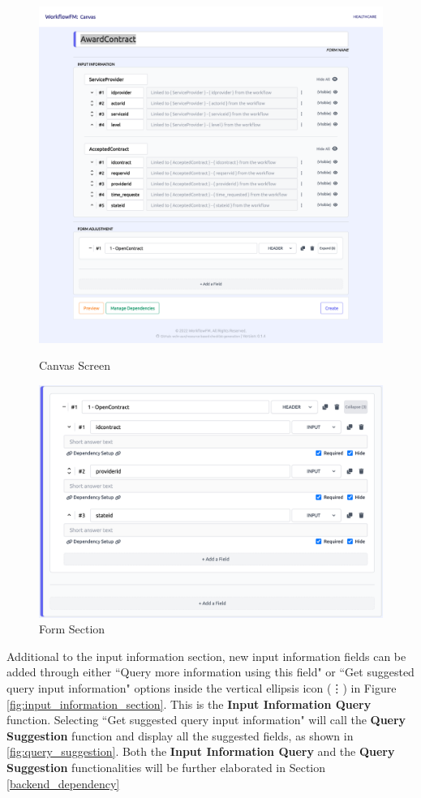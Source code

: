 \begin{figure}[ht!]
\centering
\begin{minipage}{.5\textwidth}
  \centering
  \includegraphics[width=0.9\linewidth]{overleaf/images/screens/canvas_screen.png}
  \caption{Canvas Screen}
  \label{fig:canvas_screen}
\end{minipage}%
\begin{minipage}{.5\textwidth}
  \centering
  \includegraphics[width=0.9\linewidth]{overleaf/images/screens/form_section.png}
  \caption{Form Section}
  \label{fig:form_section}
\end{minipage}
\end{figure}


Additional to the input information section, new input information fields can be added through either ``Query more information using this field" or ``Get suggested query input information" options inside the vertical ellipsis icon (\vdots) in Figure \ref{fig:input_information_section}. This is the \textbf{Input Information Query} function. Selecting ``Get suggested query input information" will call the \textbf{Query Suggestion} function and display all the suggested fields, as shown in \ref{fig:query_suggestion}. Both the \textbf{Input Information Query} and the \textbf{Query Suggestion} functionalities will be further elaborated in Section \ref{backend_dependency}

